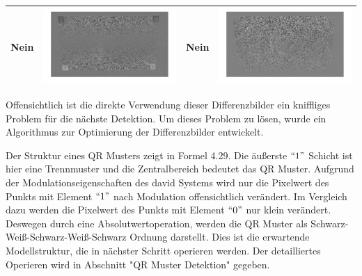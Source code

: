 \begin{table}[htb]
\begin{tabular}{|p{2cm}<{\centering}|c|p{2cm}<{\centering}|c|}
	Nein & \includegraphics[scale=0.15]{images/3_Ersteverfahren/Differenzbild/4halbschwaryhalbweis.pdf}& Nein & \includegraphics[scale=0.15]{images/3_Ersteverfahren/Differenzbild/5aufheben.pdf}\\

	\bottomrule
	\end{tabular}
\end{table} 


Offensichtlich ist die direkte Verwendung dieser Differenzbilder ein kniffliges Problem für die nächste Detektion. Um dieses Problem zu lösen, wurde ein Algorithmus zur Optimierung der Differenzbilder entwickelt.

Der Struktur eines QR Musters zeigt in Formel 4.29. Die äußerste $``1"$ Schicht ist hier eine Trennmuster und die Zentralbereich bedeutet das QR Muster. Aufgrund der Modulationseigenschaften des \gls{david} Systems wird nur die Pixelwert des Punkts mit Element $``1"$ nach Modulation offensichtlich verändert. Im Vergleich dazu werden die Pixelwert des Punkts mit Element $``0"$ nur klein verändert. Deswegen durch eine Absolutwertoperation, werden die QR Muster als Schwarz-Weiß-Schwarz-Weiß-Schwarz Ordnung darstellt. Dies ist die erwartende Modellstruktur, die in nächster Schritt operieren werden. Der detailliertes Operieren wird in Abschnitt "QR Muster Detektion" gegeben.

